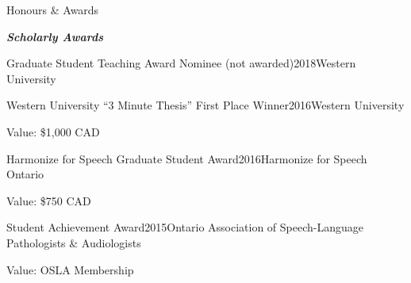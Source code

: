 \documentclass{resume} %
\begin{document}
\begin{rSection}{Honours \& Awards}

\begin{center}
	{\bf \emph{Scholarly Awards}}
\end{center}

%

\begin{rSubsection}{Graduate Student Teaching Award Nominee (not awarded)}{2018}{Western University}{}
\end{rSubsection}


\begin{rSubsection}{Western University ``3 Minute Thesis'' First Place Winner}{2016}{Western University}{}
	\item  Value: \$1,000 CAD
\end{rSubsection}

\begin{rSubsection}{Harmonize for Speech Graduate Student Award}{2016}{Harmonize for Speech Ontario}{}
	\item Value: \$750 CAD
\end{rSubsection}

\begin{rSubsection}{Student Achievement Award}{2015}{Ontario Association of Speech-Language Pathologists \&
Audiologists}{}
	\item Value: OSLA Membership
\end{rSubsection}


\end{rSection}
\end{document}
